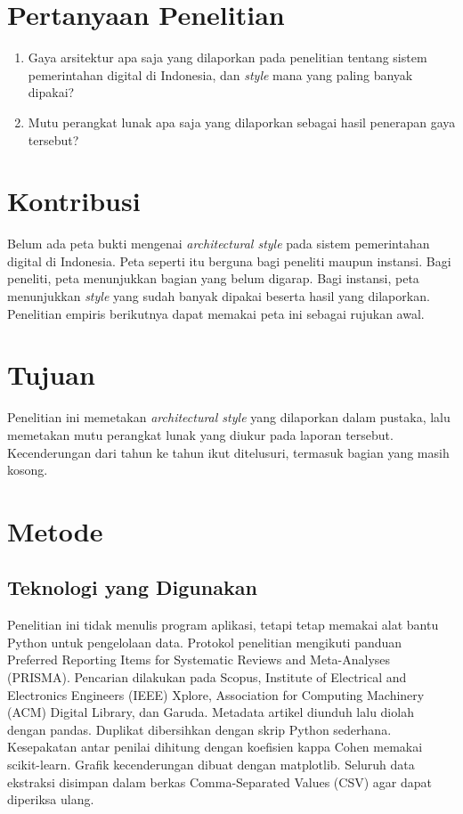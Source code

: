 \documentclass[11pt,a4paper]{article}
\begin{document}
\section{Pertanyaan Penelitian}

\begin{enumerate}[label=\textbf{Pertanyaan \arabic*.}, leftmargin=*, labelsep=0.5em]
  \item Gaya arsitektur apa saja yang dilaporkan pada penelitian tentang sistem pemerintahan digital di Indonesia, dan \textit{style} mana yang paling banyak dipakai?
  \item Mutu perangkat lunak apa saja yang dilaporkan sebagai hasil penerapan gaya tersebut?
\end{enumerate}

\section{Kontribusi}

Belum ada peta bukti mengenai \textit{architectural style} pada sistem pemerintahan digital di Indonesia. Peta seperti itu berguna bagi peneliti maupun instansi. Bagi peneliti, peta menunjukkan bagian yang belum digarap. Bagi instansi, peta menunjukkan \textit{style} yang sudah banyak dipakai beserta hasil yang dilaporkan. Penelitian empiris berikutnya dapat memakai peta ini sebagai rujukan awal.

\section{Tujuan}

Penelitian ini memetakan \textit{architectural style} yang dilaporkan dalam pustaka, lalu memetakan mutu perangkat lunak yang diukur pada laporan tersebut. Kecenderungan dari tahun ke tahun ikut ditelusuri, termasuk bagian yang masih kosong.

\section{Metode}

\subsection{Teknologi yang Digunakan}

Penelitian ini tidak menulis program aplikasi, tetapi tetap memakai alat bantu Python untuk pengelolaan data. Protokol penelitian mengikuti panduan Preferred Reporting Items for Systematic Reviews and Meta-Analyses (PRISMA). Pencarian dilakukan pada Scopus, Institute of Electrical and Electronics Engineers (IEEE) Xplore, Association for Computing Machinery (ACM) Digital Library, dan Garuda. Metadata artikel diunduh lalu diolah dengan pandas. Duplikat dibersihkan dengan skrip Python sederhana. Kesepakatan antar penilai dihitung dengan koefisien kappa Cohen memakai scikit-learn. Grafik kecenderungan dibuat dengan matplotlib. Seluruh data ekstraksi disimpan dalam berkas Comma-Separated Values (CSV) agar dapat diperiksa ulang.
\end{document}
